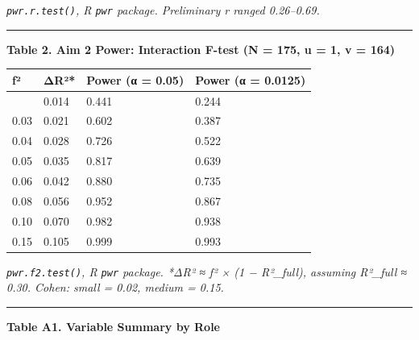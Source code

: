 \documentclass[
]{article}
\begin{document}
\emph{\texttt{pwr.r.test()}, R \texttt{pwr} package. Preliminary
\textbar r\textbar{} ranged 0.26--0.69.}

\begin{center}\rule{0.5\linewidth}{0.5pt}\end{center}

\textbf{Table 2. Aim 2 Power: Interaction F-test (N = 175, u = 1, v =
164)}

\begin{longtable}[]{@{}llll@{}}
\toprule\noalign{}
f² & ΔR²* & Power (α = 0.05) & Power (α = 0.0125) \\
\midrule\noalign{}
\endhead
\bottomrule\noalign{}
\endlastfoot
0.02 & 0.014 & 0.441 & 0.244 \\
0.03 & 0.021 & 0.602 & 0.387 \\
0.04 & 0.028 & 0.726 & 0.522 \\
0.05 & 0.035 & 0.817 & 0.639 \\
0.06 & 0.042 & 0.880 & 0.735 \\
0.08 & 0.056 & 0.952 & 0.867 \\
0.10 & 0.070 & 0.982 & 0.938 \\
0.15 & 0.105 & 0.999 & 0.993 \\
\end{longtable}

\emph{\texttt{pwr.f2.test()}, R \texttt{pwr} package. *ΔR² ≈ f² × (1 −
R²\_full), assuming R²\_full ≈ 0.30. Cohen: small = 0.02, medium =
0.15.}

\begin{center}\rule{0.5\linewidth}{0.5pt}\end{center}

\textbf{Table A1. Variable Summary by Role}
\end{document}
